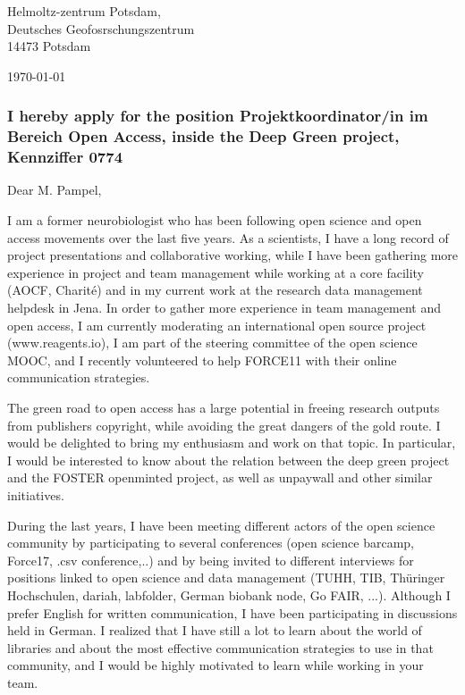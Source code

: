 \hspace*{0.5\linewidth}
\begin{minipage}{0.4\linewidth}
Helmoltz-zentrum Potsdam,\\
Deutsches Geofosrschungszentrum\\
14473 Potsdam\\

\end{minipage}

\vspace {-0.8cm} 
\today

\vspace {-0.8cm} 

%
\subsubsection* {I hereby apply for the position Projektkoordinator/in im Bereich Open Access, inside the Deep Green project, Kennziffer 0774}
  
\vspace {-0.8cm} 
Dear M. Pampel,

I am a former neurobiologist who has been following open science and open access movements over the last five years. As a scientists, I have a long record of project presentations and collaborative working, while I have been gathering more experience in project and team management while working at a core facility (AOCF, Charit\'{e}) and in my current work at the research data management helpdesk in Jena. In order to gather more experience in team management and open access, I am  currently moderating an international open source project (www.reagents.io), I am part of the steering committee of the open science MOOC,  and I recently volunteered to help FORCE11 with their online communication strategies.
%





The green road to open access has a large potential in freeing research outputs from publishers copyright, while avoiding the great dangers of the gold route. I would be delighted to bring my enthusiasm and work on that topic. In particular, I would be interested to know about the relation between the deep green project and the FOSTER openminted project, as well as unpaywall and other similar initiatives.

During the last years, I have been meeting different actors of the open science community by participating to  several conferences (open science barcamp, Force17, .csv conference,..) and by being invited to different interviews for positions linked to open science and data management (TUHH, TIB, Th\"{u}ringer Hochschulen, dariah, labfolder, German biobank node,  Go FAIR, ...). Although I prefer English for written communication, I have been participating in discussions held in German. 
 I realized that I have still a lot to learn about the world of libraries and about the  most effective communication strategies to use in that community, and I would be highly motivated to learn while working in your team.
 
